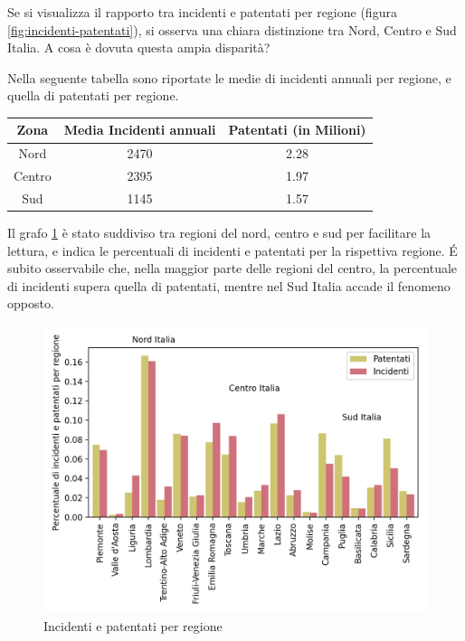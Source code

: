 \documentclass[a4paper,12pt]{report}
\begin{document}
Se si visualizza il rapporto tra incidenti e patentati per regione 
(figura \ref{fig:incidenti-patentati}), si osserva una chiara distinzione 
tra Nord, Centro e Sud Italia. 
A cosa è dovuta questa ampia disparità?

Nella seguente tabella sono riportate le medie di incidenti annuali per regione, 
e quella di patentati per regione.

\begin{center}
    \def\arraystretch{1.5}%
    \begin{tabular}{ |c|c|c| } 
    \hline
    Zona & Media Incidenti annuali & Patentati (in Milioni) \\ 
    \hline
    \rowcolor{TableGray}
    Nord    &   2470 &   2.28 \\ 
    Centro  &   2395 &   1.97 \\ 
    \rowcolor{TableGray}
    Sud     &   1145 &   1.57 \\ 
    \hline
    \end{tabular}
\end{center}

Il grafo \ref{fig:incidenti-patentati-bar} è stato suddiviso tra regioni del nord, 
centro e sud per facilitare la lettura, e indica le percentuali di incidenti e 
patentati per la rispettiva regione. 
\'E subito osservabile che, nella maggior parte delle regioni del centro, 
la percentuale di incidenti supera quella di patentati, 
mentre nel Sud Italia accade il fenomeno opposto.

\begin{figure}
    \hfill\includegraphics[width=0.7\linewidth]{../src/incidenti/incidenti_aci/mappe_regioni/incidenti_patenti_bar.png}\hspace*{\fill}
    \caption{Incidenti e patentati per regione}
    \label{fig:incidenti-patentati-bar}
\end{figure}
\end{document}
